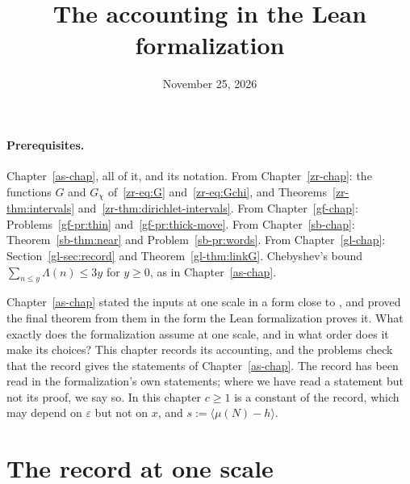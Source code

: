 \documentclass[reqno]{amsart}
\title{The accounting in the Lean formalization}
\author{}
\date{November 25, 2026}
\newcounter{chap}
\theoremstyle{definition}
\theoremstyle{plain}
\begin{document}
\maketitle
{}\label{chap}

\paragraph{Prerequisites.}
Chapter~\ref{as-chap}, all of it, and its notation.  From Chapter~\ref{zr-chap}: the functions \(G\) and \(G_\chi\) of~\eqref{zr-eq:G} and~\eqref{zr-eq:Gchi}, and Theorems~\ref{zr-thm:intervals} and~\ref{zr-thm:dirichlet-intervals}.  From Chapter~\ref{gf-chap}: Problems~\ref{gf-pr:thin} and~\ref{gf-pr:thick-move}.  From Chapter~\ref{sb-chap}: Theorem~\ref{sb-thm:near} and Problem~\ref{sb-pr:words}.  From Chapter~\ref{gl-chap}: Section~\ref{gl-sec:record} and Theorem~\ref{gl-thm:linkG}.  Chebyshev's bound \(\sum_{n \le y}\Lambda(n) \le 3y\) for \(y \ge 0\), as in Chapter~\ref{as-chap}.

\medskip
Chapter~\ref{as-chap} stated the inputs at one scale in a form close to \cite{Adr}, and proved the final theorem from them in the form the Lean formalization \cite{Lean} proves it.  What exactly does the formalization assume at one scale, and in what order does it make its choices?  This chapter records its accounting, and the problems check that the record gives the statements of Chapter~\ref{as-chap}.  The record has been read in the formalization's own statements; where we have read a statement but not its proof, we say so.  In this chapter \(c \ge 1\) is a constant of the record, which may depend on \(\varepsilon\) but not on \(x\), and \(s := \langle\mu(N) - h\rangle\).

\section{The record at one scale}\label{sec:record}
\end{document}
